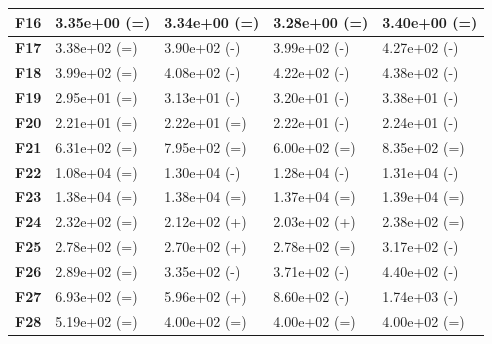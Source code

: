 \documentclass[12pt,a4paper]{report}
\begin{document}
{{{{{{{\begin{table}[h]
\begin{tabular}{|l|l|l|l|l|}
{\bf F16} & 3.35e+00 (=)        & 3.34e+00 (=)     & 3.28e+00 (=)     & 3.40e+00 (=)     \\ \hline
{\bf F17} & 3.38e+02 (=)        & 3.90e+02 (-)     & 3.99e+02 (-)     & 4.27e+02 (-)     \\ \hline
{\bf F18} & 3.99e+02 (=)        & 4.08e+02 (-)     & 4.22e+02 (-)     & 4.38e+02 (-)     \\ \hline
{\bf F19} & 2.95e+01 (=)        & 3.13e+01 (-)     & 3.20e+01 (-)     & 3.38e+01 (-)     \\ \hline
{\bf F20} & 2.21e+01 (=)        & 2.22e+01 (=)     & 2.22e+01 (-)     & 2.24e+01 (-)     \\ \hline
{\bf F21} & 6.31e+02 (=)        & 7.95e+02 (=)     & 6.00e+02 (=)     & 8.35e+02 (=)     \\ \hline
{\bf F22} & 1.08e+04 (=)        & 1.30e+04 (-)     & 1.28e+04 (-)     & 1.31e+04 (-)     \\ \hline
{\bf F23} & 1.38e+04 (=)        & 1.38e+04 (=)     & 1.37e+04 (=)     & 1.39e+04 (=)     \\ \hline
{\bf F24} & 2.32e+02 (=)        & 2.12e+02 (+)     & 2.03e+02 (+)     & 2.38e+02 (=)     \\ \hline
{\bf F25} & 2.78e+02 (=)        & 2.70e+02 (+)     & 2.78e+02 (=)     & 3.17e+02 (-)     \\ \hline
{\bf F26} & 2.89e+02 (=)        & 3.35e+02 (-)     & 3.71e+02 (-)     & 4.40e+02 (-)     \\ \hline
{\bf F27} & 6.93e+02 (=)        & 5.96e+02 (+)     & 8.60e+02 (-)     & 1.74e+03 (-)     \\ \hline
{\bf F28} & 5.19e+02 (=)        & 4.00e+02 (=)     & 4.00e+02 (=)     & 4.00e+02 (=)     \\ \hline
\end{tabular}
\end{table}

}}}}}}}
\end{document}
